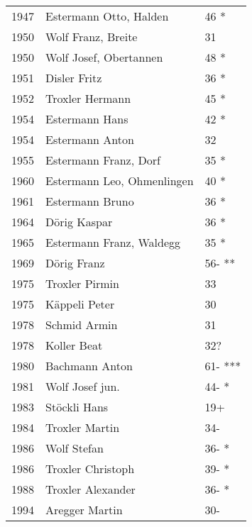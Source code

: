{\begin{longtable}{ l l l }
        1947          & Estermann Otto,  Halden       & 46 *        \\
        1950          & Wolf Franz, Breite            & 31          \\
        1950          & Wolf Josef, Obertannen        & 48 *        \\
        1951          & Disler Fritz                  & 36 *        \\
        1952          & Troxler Hermann               & 45 *        \\
        1954          & Estermann Hans                & 42 *        \\
        1954          & Estermann Anton               & 32          \\
        1955          & Estermann Franz, Dorf         & 35 *        \\
        1960          & Estermann Leo, Ohmenlingen    & 40 *        \\
        1961          & Estermann Bruno               & 36 *        \\
        1964          & Dörig Kaspar                  & 36 *        \\
        1965          & Estermann Franz, Waldegg      & 35 *        \\
        1969          & Dörig Franz                   & 56- **      \\
        1975          & Troxler Pirmin                & 33          \\
        1975          & Käppeli Peter                 & 30          \\
        1978          & Schmid Armin                  & 31          \\
        1978          & Koller Beat                   & 32?         \\
        1980          & Bachmann Anton                & 61- ***     \\
        1981          & Wolf Josef jun.               & 44- *       \\
        1983          & Stöckli Hans                  & 19+         \\
        1984          & Troxler Martin                & 34-         \\
        1986          & Wolf Stefan                   & 36- *       \\
        1986          & Troxler Christoph             & 39- *       \\
        1988          & Troxler Alexander             & 36- *       \\
        1994          & Aregger Martin                & 30-         \\
    \end{longtable}
    \unskip
    \unpenalty
    \unpenalty}

